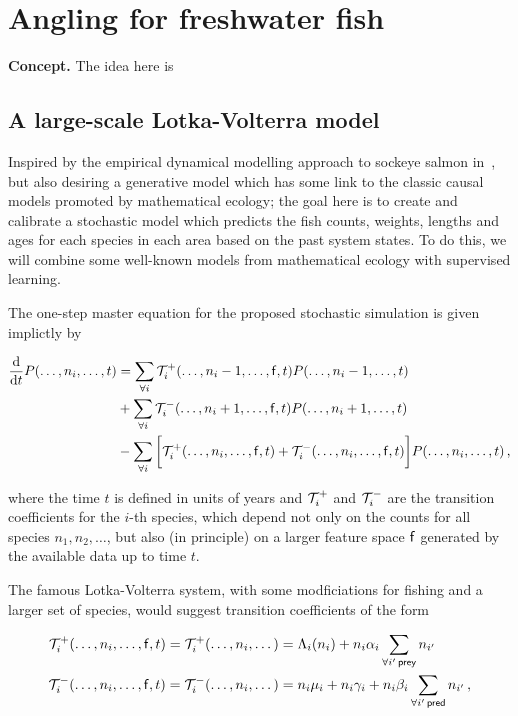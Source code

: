 \documentclass{book}
\begin{document}
\chapter{\sffamily Angling for freshwater fish}

{\bfseries\sffamily Concept.} The idea here is 

\section{\sffamily A large-scale Lotka-Volterra model}

Inspired by the empirical dynamical modelling approach to sockeye salmon in~\cite{ye2015equation}, but also desiring a generative model which has some link to the classic causal models promoted by mathematical ecology; the goal here is to create and calibrate a stochastic model which predicts the fish counts, weights, lengths and ages for each species in each area based on the past system states. To do this, we will combine some well-known models from mathematical ecology with supervised learning.

The one-step master equation for the proposed stochastic simulation is given implictly by

\begin{align}
\frac{{\rm d}}{{\rm d} t} P(\dots, n_{i}, \dots, t) &= \sum_{\forall i}{\cal T}^{+}_{i}(\dots, n_i-1, \dots, {\sf f}, t)P(\dots, n_{i}-1, \dots, t) \\
&+ \sum_{\forall i}{\cal T}^{-}_{i}(\dots, n_i+1, \dots, {\sf f}, t)P(\dots, n_{i}+1, \dots, t) \\
&- \sum_{\forall i}\bigg[ {\cal T}^{+}_{i}(\dots, n_i, \dots, {\sf f}, t) + {\cal T}^{-}_{i}(\dots, n_i, \dots, {\sf f}, t) \bigg] P(\dots, n_{i}, \dots,t) \,,
\end{align}

where the time $t$ is defined in units of years and ${\cal T}^{+}_{i}$ and ${\cal T}^{-}_{i}$ are the transition coefficients for the $i$-th species, which depend not only on the counts for all species $n_1, n_2, \dots$, but also (in principle) on a larger feature space ${\sf f}$ generated by the available data up to time $t$.

The famous Lotka-Volterra system, with some modficiations for fishing and a larger set of species, would suggest transition coefficients of the form


\begin{align}
{\cal T}^{+}_{i}(\dots, n_i, \dots, {\sf f}, t) = {\cal T}^{+}_{i}(\dots, n_i, \dots) &= \Lambda_{i}(n_{i}) + n_{i}\alpha_{i}\sum_{\forall i' \, {\sf prey}}n_{i'}\\
{\cal T}^{-}_{i}(\dots, n_i, \dots, {\sf f}, t) = {\cal T}^{-}_{i}(\dots, n_i, \dots) &= n_{i}\mu_{i} +  n_{i}\gamma_{i} + n_{i}\beta_{i} \sum_{\forall i' \, {\sf pred}} n_{i'} \,,
\end{align}
\end{document}
